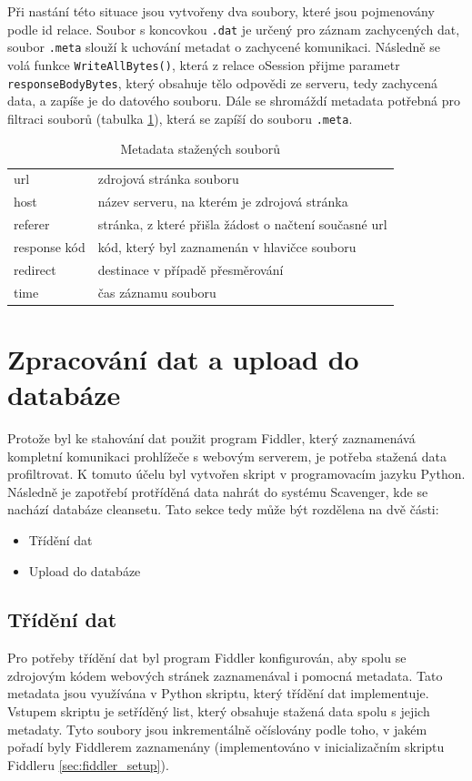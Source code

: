 \documentclass[thesis=M,czech,hidelinks]{FITthesis}[2013/05/06]
\begin{document}
Při nastání této situace jsou vytvořeny dva soubory, které jsou pojmenovány podle id relace. Soubor s koncovkou \texttt{.dat} je určený pro záznam zachycených dat, soubor \texttt{.meta} slouží k uchování metadat o zachycené komunikaci. Následně se volá funkce \texttt{WriteAllBytes()}, která z relace oSession přijme parametr \texttt{responseBodyBytes}, který obsahuje tělo odpovědi ze serveru, tedy zachycená data, a zapíše je do datového souboru. Dále se shromáždí metadata potřebná pro filtraci souborů (tabulka \ref{fig:meta}), která se zapíší do souboru \texttt{.meta}. 


\begin{table}[h]
	
	\centering
	\begin{tabular}{ll}
		url         	&  zdrojová stránka souboru \\
		host        	&  název serveru, na kterém je zdrojová stránka \\
		referer       	&  stránka, z které přišla žádost o načtení současné url \\
		response kód   	&  kód, který byl zaznamenán v hlavičce souboru  \\
		redirect		&  destinace v případě přesměrování \\
		time			&  čas záznamu souboru
	\end{tabular}
	
	\caption{Metadata stažených souborů}
	\label{fig:meta}
\end{table}



\section{Zpracování dat a upload do databáze}
Protože byl ke stahování dat použit program Fiddler, který zaznamenává kompletní komunikaci prohlížeče s webovým serverem, je potřeba stažená data profiltrovat. K tomuto účelu byl vytvořen skript v programovacím jazyku Python. Následně je zapotřebí protříděná data nahrát do systému Scavenger, kde se nachází databáze cleansetu. Tato sekce tedy může být rozdělena na dvě části:
\begin{itemize}
	\item Třídění dat
	\item Upload do databáze
\end{itemize}



\subsection{Třídění dat}\label{sec:trideni}
Pro potřeby třídění dat byl program Fiddler konfigurován, aby spolu se zdrojovým kódem webových stránek zaznamenával i pomocná metadata. Tato metadata jsou využívána v Python skriptu, který třídění dat implementuje. Vstupem skriptu je setříděný list, který obsahuje stažená data spolu s jejich metadaty. Tyto soubory jsou inkrementálně očíslovány podle toho, v jakém pořadí byly Fiddlerem zaznamenány (implementováno v inicializačním skriptu Fiddleru \ref{sec:fiddler_setup}).
\end{document}
